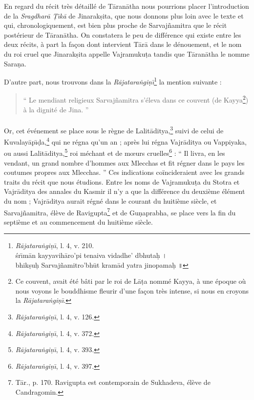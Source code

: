 \documentclass[a4paper, 11pt, oneside, french]{article}
\begin{document}
En regard du récit très détaillé de T\={a}ran\={a}tha nous pourrions placer l'introduction de la \emph{Sragdhar\={a} Ṭ\={\i}k\={a}} de Jinarak\d{s}ita, que nous donnons plus loin avec le texte et qui, chronologiquement, est bien plus proche de Sarvaj\~{n}amitra que le récit postérieur de T\={a}ran\={a}tha. On constatera le peu de différence qui existe entre les deux récits, à part la façon dont intervient T\={a}r\={a} dans le dénouement, et le nom du roi cruel que Jinarak\d{s}ita appelle Vajramuku\d{t}a tandis que T\={a}ran\={a}tha le nomme Sara\d{n}a.

D'autre part, nous trouvons dans la \emph{R\={a}jatara\.{n}gi\d{n}\={\i}}\footnote{\emph{R\={a}jatara\.{n}gi\d{n}\={\i}}, l. 4, v. 210.\\\hspace*{10mm}\'{s}r\={\i}m\={a}n kayyavih\={a}ro'pi tenaiva vidadhe' dbhuta\d{h} \texthindi{।}\\\hspace*{10mm}bhik\d{s}u\d{h} Sarvaj\~{n}amitro'bh\={u}t kram\={a}d yatra jinopama\d{h} \texthindi{॥}} la mention suivante :
\begin{quotation}
`` Le mendiant religieux Sarvaj\~{n}amitra s'éleva dans ce couvent (de Kayya\footnote{Ce couvent, avait été bâti par le roi de L\={a}\d{t}a nommé Kayya, à une époque où nous voyons le bouddhisme fleurir d'une façon très intense, si nous en croyons la \emph{R\={a}jatara\.{n}gi\d{n}\={\i}}.}) à la dignité de Jina. ''
\end{quotation}
\paragraph{}
Or, cet événement se place sous le règne de Lalit\={a}ditya,\footnote{\emph{R\={a}jatara\.{n}gi\d{n}\={\i}}, l. 4, v. 126.} suivi de celui de Kuvalay\={a}p\={\i}\d{d}a,\footnote{\emph{R\={a}jatara\.{n}gi\d{n}\={\i}}, l. 4, v. 372.} qui ne régna qu'un an ; après lui régna Vajr\={a}ditya ou Vappiyaka, ou aussi Lalit\={a}ditya,\footnote{\emph{R\={a}jatara\.{n}gi\d{n}\={\i}}, l. 4, v. 393.} roi méchant et de mœurs cruelles\footnote{\emph{R\={a}jatara\.{n}gi\d{n}\={\i}}, l. 4, v. 397.} : `` Il livra, en les vendant, un grand nombre d'hommes aux Mlecchas et fit régner dans le pays les coutumes propres aux Mlecchas. '' Ces indications coïncideraient avec les grands traits du récit que nous étudions. Entre les noms de Vajramuku\d{t}a du Stotra et Vajr\={a}ditya des annales du Kasmir il n'y a que la différence du deuxième élément du nom ; Vajr\={a}ditya aurait régné dans le courant du huitième siècle, et Sarvaj\~{n}amitra, élève de Ravigupta\footnote{T\={a}r., p. 170. Ravigupta est contemporain de Sukhadeva, élève de Candragomin.} et de Gu\d{n}aprabha, se place vers la fin du septième et au commencement du huitième siècle.
\end{document}
